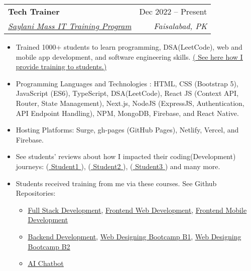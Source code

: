 \documentclass[letterpaper,11pt]{article}
\makeatletter
\newcommand{\resumeItem}[1]{
  \item\small{
    {#1 \vspace{-2pt}}
  }
}
\newcommand{\resumeSubheading}[4]{
  \vspace{-2pt}\item
    \begin{tabular*}{0.97\textwidth}[t]{l@{\extracolsep{\fill}}r}
      \textbf{#1} & #2 \\
      \textit{\small#3} & \textit{\small #4} \\
    \end{tabular*}\vspace{-7pt}
}
\newcommand{\resumeItemListStart}{\begin{itemize}}
\newcommand{\resumeItemListEnd}{\end{itemize}\vspace{-5pt}}
\makeatother
\begin{document}
\resumeSubheading
{Tech Trainer}{Dec 2022 -- Present}
{{\href{https://saylaniwelfareusa.com/en/services/education/technical-education/saylani-mass-it-training}{\underline{Saylani Mass IT Training Program}}}}{Faisalabad, PK}
\resumeItemListStart
\resumeItem{Trained 1000+ students to learn programming, DSA(LeetCode), web and mobile app development, and software engineering skills. {\href{https://www.linkedin.com/posts/ahmad-jajja_learn-to-code-with-activity-7151895134744256512-Dmyf?utm_source=share&utm_medium=member_desktop}{\underline{( See here how I provide training to students.)}}}}
\resumeItem{Programming Languages and Technologies : HTML, CSS (Bootstrap 5), JavaScript (ES6), TypeScript, DSA(LeetCode), React JS (Context API, Router, State Management), Next.js, NodeJS (ExpressJS, Authentication, API Endpoint Handling), NPM, MongoDB, Firebase, and React Native.}
\resumeItem{Hosting Platforms: Surge, gh-pages (GitHub Pages), Netlify, Vercel, and Firebase.}
\resumeItem{See students' reviews about how I impacted their coding(Development) journeys: ({\href{https://www.linkedin.com/posts/hassan-gulzar-256292267_javascript-problemsolvingskills-activity-7092472595249270784-PFDk?utm_source=share&utm_medium=member_desktop}{\underline{ Student1 }}}), ({\href{https://www.linkedin.com/posts/arhamansari12_nodejs-expressjs-mongodb-activity-7137844125382418432-SBrL?utm_source=share&utm_medium=member_desktop}{\underline{ Student2 }}}), ({\href{https://www.linkedin.com/feed/update/urn:li:activity:7171897869098962944/}{\underline{ Student3 }}}) and many more. }
\resumeItem{Students received training from me via these courses. See Github Repositories:}
\begin{itemize}
  \item {\href{https://github.com/Ahmadjajja/SMIT-Web-and-Mobile-Batch7}{\underline{Full Stack Development}}, \hspace{8pt} \href{https://github.com/Ahmadjajja/SMIT-WMA-6-A-E}{\underline{Frontend Web Development}}, \hspace{8pt} \href{https://github.com/Ahmadjajja/Mobile_Application_Development}{\underline{Frontend Mobile Development }}}
  \item {\href{https://github.com/Ahmadjajja/Backend_Development.git}{\underline{Backend Development}}, \hspace{12pt} \href{https://github.com/Ahmadjajja/Web_Designing_Crash_Course_A}{\underline{Web Designing Bootcamp B1}}, \hspace{6pt} \href{https://github.com/Ahmadjajja/Web_Designing_Crash_Course_B}{\underline{Web Designing Bootcamp B2}}}
  \item {\href{https://github.com/Ahmadjajja/AI-Chatbot}{\underline{AI Chatbot}}}
\end{itemize}
\resumeItemListEnd
\end{document}
